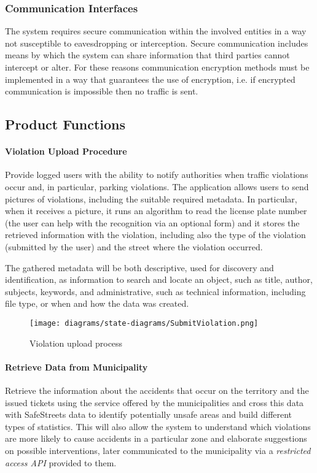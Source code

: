 \subsubsection{Communication Interfaces}
	The system requires secure communication within the involved entities in a way not susceptible to eavesdropping or interception. Secure communication includes means by which the system can share information that third parties cannot intercept or alter. For these reasons communication encryption methods must be implemented in a way that guarantees the use of encryption, i.e. if encrypted communication is impossible then no traffic is sent.

\subsection{Product Functions}
\paragraph{Violation Upload Procedure} 
Provide logged users with the ability to notify authorities when traffic violations occur and, in particular, parking violations. The application allows users to send pictures of violations, including the suitable required metadata. In particular, when it receives a picture, it runs an algorithm to read the license plate number (the user can help with the recognition via an optional form) and it stores the retrieved information with the violation, including also the type of the violation (submitted by the user) and the street where the violation occurred.

The gathered metadata will be both descriptive, used for discovery and identification, as information to search and locate an object, such as title, author, subjects, keywords, and administrative, such as technical information, including file type, or when and how the data was created.
\clearpage

	\begin{figure}[h]
		\centering
		\texttt{[image: diagrams/state-diagrams/SubmitViolation.png]}
		\caption{
			\label{fig:violationUpload} Violation upload process
		}
	\end{figure}
	
\paragraph{Retrieve Data from Municipality}
Retrieve the information about the accidents that occur on the territory and the issued tickets using the service offered by the municipalities and cross this data with SafeStreets data to identify potentially unsafe areas and build different types of statistics. This will also allow the system to understand which violations are more likely to cause accidents in a particular zone and elaborate suggestions on possible interventions, later communicated to the municipality via a \emph{restricted access API} provided to them. \newline

